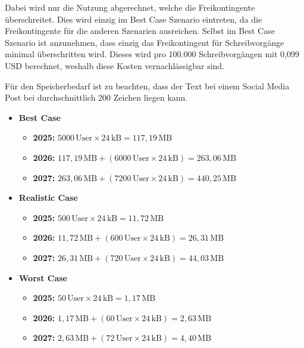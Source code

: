 Dabei wird nur die Nutzung abgerechnet, welche die Freikontingente überschreitet.
Dies wird einzig im Best Case Szenario eintreten, da die Freikontingente für die anderen Szenarien ausreichen.
Selbst im Best Case Szenario ist anzunehmen, dass einzig das Freikontingent für Schreibvorgänge minimal überschritten wird.
Dieses wird pro 100.000 Schreibvorgängen mit 0,099 USD berechnet, weshalb diese Kosten vernachlässigbar sind.

Für den Speicherbedarf ist zu beachten, dass der Text bei einem Social Media Post bei durchschnittlich 200 Zeichen liegen kann.

\begin{itemize}
    \item \textbf{Best Case}
    \begin{itemize}
        \item \textbf{2025:} \(5000 \, \text{User} \times 24 \, \text{kB} = 117,19 \, \text{MB}\)
        \item \textbf{2026:} \(117,19 \, \text{MB} + (6000 \, \text{User} \times 24 \, \text{kB}) = 263,06 \, \text{MB}\)
        \item \textbf{2027:} \(263,06 \, \text{MB} + (7200 \, \text{User} \times 24 \, \text{kB}) = 440,25 \, \text{MB}\)
    \end{itemize}

    \item \textbf{Realistic Case}
    \begin{itemize}
        \item \textbf{2025:} \(500 \, \text{User} \times 24 \, \text{kB} = 11,72 \, \text{MB}\)
        \item \textbf{2026:} \(11,72 \, \text{MB} + (600 \, \text{User} \times 24 \, \text{kB}) = 26,31 \, \text{MB}\)
        \item \textbf{2027:} \(26,31 \, \text{MB} + (720 \, \text{User} \times 24 \, \text{kB}) = 44,03 \, \text{MB}\)
    \end{itemize}

    \item \textbf{Worst Case}
    \begin{itemize}
        \item \textbf{2025:} \(50 \, \text{User} \times 24 \, \text{kB} = 1,17 \, \text{MB}\)
        \item \textbf{2026:} \(1,17 \, \text{MB} + (60 \, \text{User} \times 24 \, \text{kB}) = 2,63 \, \text{MB}\)
        \item \textbf{2027:} \(2,63 \, \text{MB} + (72 \, \text{User} \times 24 \, \text{kB}) = 4,40 \, \text{MB}\)
    \end{itemize}
\end{itemize}

